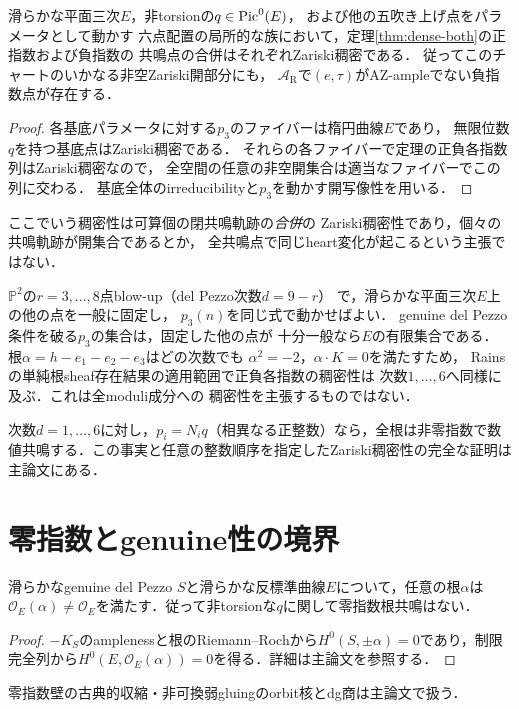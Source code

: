 \begin{corollary}[正負共鳴が全パラメータ空間で稠密]
\label{cor:dense-total}
滑らかな平面三次$E$，非torsionの$q\in\operatorname{Pic}^0(E)$，
および他の五吹き上げ点をパラメータとして動かす
六点配置の局所的な族において，定理\ref{thm:dense-both}の正指数および負指数の
共鳴点の合併はそれぞれZariski稠密である．
従ってこのチャートのいかなる非空Zariski開部分にも，
$\mathcal A_{\mathrm R}$で$(e,\tau)$がAZ-ampleでない負指数点が存在する．
\end{corollary}
\begin{proof}
各基底パラメータに対する$p_3$のファイバーは楕円曲線$E$であり，
無限位数$q$を持つ基底点はZariski稠密である．
それらの各ファイバーで定理の正負各指数列はZariski稠密なので，
全空間の任意の非空開集合は適当なファイバーでこの列に交わる．
基底全体のirreducibilityと$p_3$を動かす開写像性を用いる．
\end{proof}
\begin{remark}
ここでいう稠密性は可算個の閉共鳴軌跡の\emph{合併}の
Zariski稠密性であり，個々の共鳴軌跡が開集合であるとか，
全共鳴点で同じheart変化が起こるという主張ではない．
\end{remark}

\begin{remark}[他の次数への同じ稠密性]
$\mathbb P^2$の$r=3,\ldots,8$点blow-up（del Pezzo次数$d=9-r$）
で，滑らかな平面三次$E$上の他の点を一般に固定し，
$p_3(n)$を同じ式で動かせばよい．
genuine del Pezzo条件を破る$p_3$の集合は，固定した他の点が
十分一般なら$E$の有限集合である．
根$\alpha=h-e_1-e_2-e_3$はどの次数でも
$\alpha^2=-2$，$\alpha\cdot K=0$を満たすため，
Rainsの単純根sheaf存在結果の適用範囲で正負各指数の稠密性は
次数$1,\ldots,6$へ同様に及ぶ．これは全moduli成分への
稠密性を主張するものではない．
\end{remark}


\begin{proposition}[全次数の最大共鳴]\label{thm:all-degree-maximal}
次数$d=1,\ldots,6$に対し，$p_i=N_iq$（相異なる正整数）なら，全根は非零指数で数値共鳴する．この事実と任意の整数順序を指定したZariski稠密性の完全な証明は主論文\cite{Hearts}にある．
\end{proposition}




\section{零指数とgenuine性の境界}\label{sec:resonance-zero-summary}
\begin{proposition}\label{prop:zero-index}
滑らかなgenuine del Pezzo $S$と滑らかな反標準曲線$E$について，任意の根$\alpha$は$\mathcal O_E(\alpha)\ne\mathcal O_E$を満たす．従って非torsionな$q$に関して零指数根共鳴はない．
\end{proposition}
\begin{proof}
$-K_S$のamplenessと根のRiemann--Rochから$H^0(S,\pm\alpha)=0$であり，制限完全列から$H^0(E,\mathcal O_E(\alpha))=0$を得る．詳細は主論文\cite{Hearts}を参照する．
\end{proof}
零指数壁の古典的収縮・非可換弱gluingのorbit核とdg商は主論文で扱う．


